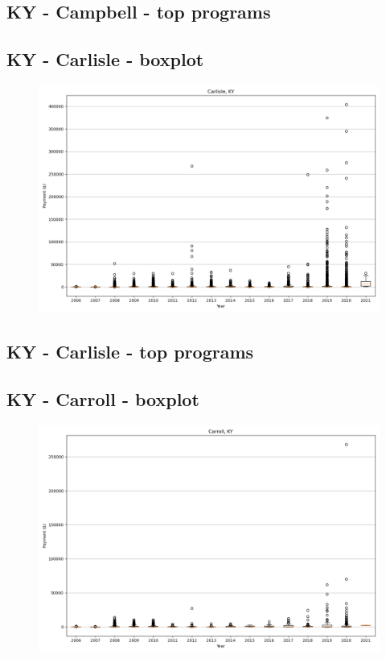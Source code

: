 \subsection*{KY - Campbell - top programs}

\newpage
\subsection*{KY - Carlisle - boxplot}
\begin{figure}[h]
\centering
\includegraphics[width=7in]{../output/boxplots/counties/Carlisle-KY_boxplot.png}
\end{figure}


\subsection*{KY - Carlisle - top programs}

\newpage
\subsection*{KY - Carroll - boxplot}
\begin{figure}[h]
\centering
\includegraphics[width=7in]{../output/boxplots/counties/Carroll-KY_boxplot.png}
\end{figure}


